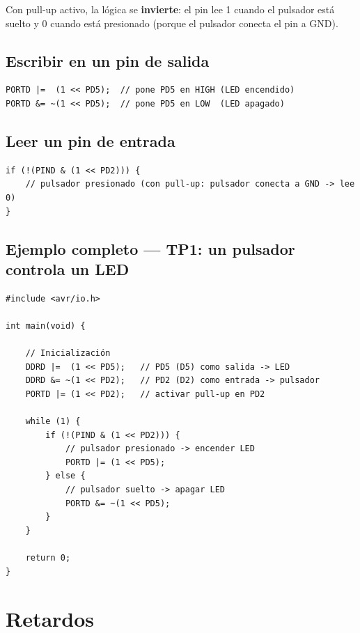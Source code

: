 Con pull-up activo, la lógica se \textbf{invierte}: el pin lee 1 cuando el pulsador
está suelto y 0 cuando está presionado (porque el pulsador conecta el pin a GND).

\subsection{Escribir en un pin de salida}

\begin{lstlisting}[style=estilo-c]
PORTD |=  (1 << PD5);  // pone PD5 en HIGH (LED encendido)
PORTD &= ~(1 << PD5);  // pone PD5 en LOW  (LED apagado)
\end{lstlisting}

\subsection{Leer un pin de entrada}

\begin{lstlisting}[style=estilo-c]
if (!(PIND & (1 << PD2))) {
    // pulsador presionado (con pull-up: pulsador conecta a GND -> lee 0)
}
\end{lstlisting}

\subsection{Ejemplo completo --- TP1: un pulsador controla un LED}

\begin{lstlisting}[style=estilo-c]
#include <avr/io.h>

int main(void) {

    // Inicialización
    DDRD |=  (1 << PD5);   // PD5 (D5) como salida -> LED
    DDRD &= ~(1 << PD2);   // PD2 (D2) como entrada -> pulsador
    PORTD |= (1 << PD2);   // activar pull-up en PD2

    while (1) {
        if (!(PIND & (1 << PD2))) {
            // pulsador presionado -> encender LED
            PORTD |= (1 << PD5);
        } else {
            // pulsador suelto -> apagar LED
            PORTD &= ~(1 << PD5);
        }
    }

    return 0;
}
\end{lstlisting}

\section{Retardos}


